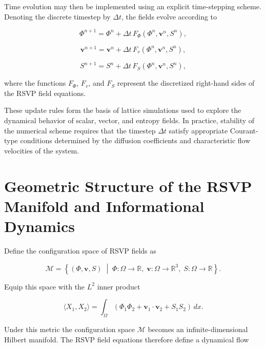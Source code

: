 \documentclass[12pt]{article}
\begin{document}
Time evolution may then be implemented using an explicit time-stepping scheme. Denoting the discrete timestep by $\Delta t$, the fields evolve according to

\begin{equation}
\Phi^{n+1} = \Phi^n + \Delta t\,F_\Phi(\Phi^n,\mathbf{v}^n,S^n),
\end{equation}

\begin{equation}
\mathbf{v}^{n+1} = \mathbf{v}^n + \Delta t\,F_v(\Phi^n,\mathbf{v}^n,S^n),
\end{equation}

\begin{equation}
S^{n+1} = S^n + \Delta t\,F_S(\Phi^n,\mathbf{v}^n,S^n),
\end{equation}

where the functions $F_\Phi$, $F_v$, and $F_S$ represent the discretized right-hand sides of the RSVP field equations.

These update rules form the basis of lattice simulations used to explore the dynamical behavior of scalar, vector, and entropy fields. In practice, stability of the numerical scheme requires that the timestep $\Delta t$ satisfy appropriate Courant-type conditions determined by the diffusion coefficients and characteristic flow velocities of the system.

\section{Geometric Structure of the RSVP Manifold and Informational Dynamics}
\label{sec:manifold}

Define the configuration space of RSVP fields as

\begin{equation}
\mathcal{M} =
\left\{ (\Phi,\mathbf{v},S) \;\middle|\;
\Phi:\Omega\to\mathbb{R},\;
\mathbf{v}:\Omega\to\mathbb{R}^3,\;
S:\Omega\to\mathbb{R}
\right\}.
\end{equation}

Equip this space with the $L^2$ inner product

\begin{equation}
\langle X_1, X_2 \rangle =
\int_{\Omega}
\left(
\Phi_1 \Phi_2 +
\mathbf{v}_1 \cdot \mathbf{v}_2 +
S_1 S_2
\right)\,dx .
\end{equation}

Under this metric the configuration space $\mathcal{M}$ becomes an infinite-dimensional Hilbert manifold. The RSVP field equations therefore define a dynamical flow
\end{document}
